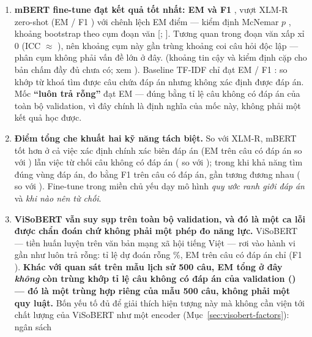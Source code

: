 \begin{enumerate}
  \item \textbf{mBERT fine-tune đạt kết quả tốt nhất: EM \mbertVoneEM{} và F1 \mbertVoneFone{}},
        vượt XLM-R zero-shot (EM \xlmrEM{} / F1 \xlmrFone{})
        \ifhasStats
        với chênh lệch EM \mbertVoneXlmrDiffEM{} điểm --- kiểm định McNemar $p$
        \mbertVoneXlmrP{}, khoảng bootstrap theo cụm đoạn văn [\mbertVoneXlmrDiffEMclo{};
        \mbertVoneXlmrDiffEMchi{}]. Tương quan trong đoạn văn xấp xỉ 0 (ICC $\approx$
        \mbertVoneICC{}), nên khoảng cụm này gần trùng khoảng coi câu hỏi độc lập --- phân cụm
        không phải vấn đề lớn ở đây.
        \else
        (khoảng tin cậy và kiểm định cặp cho bản chấm đầy đủ chưa có; xem ).
        \fi
        Baseline TF-IDF chỉ đạt EM \baselineEM{} / F1 \baselineFone{}: so khớp từ khoá tìm được
        câu chứa đáp án nhưng không xác định được đáp án. Mốc \textbf{``luôn trả rỗng''} đạt EM
        \alwaysEmptyEM{} --- đúng bằng tỉ lệ câu không có đáp án của toàn bộ validation, vì đây
        chính là định nghĩa của mốc này, không phải một kết quả học được.
  \item \textbf{Điểm tổng che khuất hai kỹ năng tách biệt.} So với XLM-R, mBERT tốt hơn ở cả việc
        xác định chính xác biên đáp án (EM trên câu có đáp án \mbertVoneHasAnsEM{} so với
        \xlmrHasAnsEM{}) lẫn việc từ chối câu không có đáp án (\mbertVoneNoAnsEM{} so với
        \xlmrNoAnsEM{}); trong khi khả năng tìm đúng vùng đáp án, đo bằng F1 trên câu có đáp án,
        gần tương đương nhau (\mbertVoneHasAnsFone{} so với \xlmrHasAnsFone{}). Fine-tune trong
        miền chủ yếu dạy mô hình \emph{quy ước ranh giới đáp án} và \emph{khi nào nên từ chối}.
  \item \textbf{ViSoBERT vẫn suy sụp trên toàn bộ validation, và đó là một ca lỗi được chẩn đoán
        chứ không phải một phép đo năng lực.} ViSoBERT --- tiền huấn luyện trên văn bản mạng xã
        hội tiếng Việt --- rơi vào hành vi gần như luôn trả rỗng: tỉ lệ dự đoán rỗng
        \visoVoneEmptyRate{}\%, EM trên câu có đáp án chỉ \visoVoneHasAnsEM{} (F1
        \visoVoneHasAnsFone{}). \textbf{Khác với quan sát trên mẫu lịch sử 500 câu, EM tổng
        \visoVoneEM{} ở đây \emph{không} còn trùng khớp tỉ lệ câu không có đáp án của validation
        (\alwaysEmptyEM{}) --- đó là một trùng hợp riêng của mẫu 500 câu, không phải một quy
        luật.} Bốn yếu tố đủ để giải thích hiện tượng này mà không cần viện tới chất lượng của
        ViSoBERT như một encoder (Mục~\ref{sec:visobert-factors}): ngân sách 

\end{enumerate}
